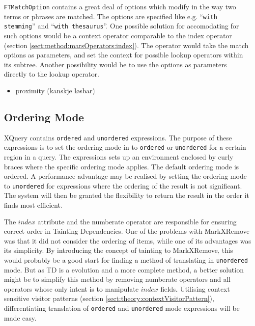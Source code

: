\texttt{FTMatchOption} contains a great deal of options which modify in the way two terms or phrases are matched.
The options are specified like e.g. ``\texttt{with stemming}'' and ``\texttt{with thesaurus}''. One possible
solution for accomodating for such options would be a context operator comparable to the \textsf{index} operator
(section \ref{sect:method:marsOperators:index}). The operator would take the match options as parameters, and set
the context for possible \textsf{lookup} operators within its subtree. Another possibility would be to use the
options as parameters directly to the \textsf{lookup} operator.


\begin{itemize}
  	\item proximity (kanskje l\o sbar)
\end{itemize}


\subsection{Ordering Mode}
\label{sect:disc:not:ord}

XQuery contains \texttt{ordered} and \texttt{unordered} expressions. The purpose of these expressions is to set
the ordering mode in to \texttt{ordered} or \texttt{unordered} for a certain region in a query. The expressions
sets up an environment enclosed by curly braces where the specific ordering mode applies. The default ordering
mode is ordered. A performance advantage may be realised by setting the ordering mode to \texttt{unordered} for
expressions where the ordering of the result is not significant. The system will then be granted the flexibility
to return the result in the order it finds most efficient.

The $index$ attribute and the \textsf{numberate} operator are responsible for ensuring correct order in Tainting
Dependencies. One of the problems with MarkXRemove was that it did not consider the ordering of items, while one
of its advantages was its simplicity. By introducing the concept of tainting to MarkXRemove, this would probably
be a good start for finding a method of translating in \texttt{unordered} mode. But as TD is a evolution and a
more complete method, a better solution might be to simplify this method by removing \textsf{numberate} operators
and all operators whose only intent is to manipulate $index$ fields. Utilising context sensitive visitor patterns
(section \ref{sect:theory:contextVisitorPattern}), differentiating translation of \texttt{ordered} and
\texttt{unordered} mode expressions will be made easy.


